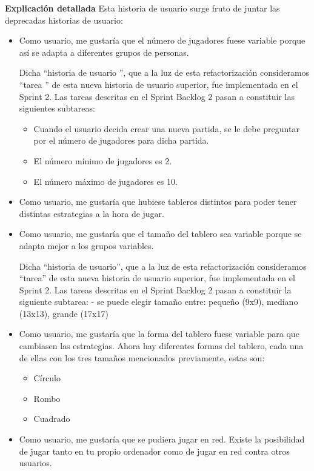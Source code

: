 \documentclass[../../FINAL/Scrum/SCRUM.tex]{subfiles}
\begin{document}
\textbf{Explicación detallada}
Esta historia de usuario surge fruto de juntar las deprecadas historias de usuario:
\begin{itemize}
\item  Como usuario, me gustaría que el número de jugadores fuese variable porque así se adapta a diferentes grupos de personas. 

    Dicha  ``historia de usuario '', que a la luz de esta refactorización consideramos  ``tarea '' de esta nueva historia de usuario superior, fue implementada en el Sprint 2. Las tareas descritas en el Sprint Backlog 2 pasan a constituir las siguientes subtareas:
    \begin{itemize}
  	  \item Cuando el usuario decida crear una nueva partida, se le debe preguntar por el número de jugadores para dicha partida.
      \item El número mínimo de jugadores es 2.
      \item El número máximo de jugadores es 10.
    \end{itemize}

\item  Como usuario, me gustaría que hubiese tableros distintos para poder tener distintas estrategias a la hora de jugar. 

\item  Como usuario, me gustaría que el tamaño del tablero sea variable porque se adapta mejor a los grupos variables. 

    Dicha  ``historia de usuario'', que a la luz de esta refactorización consideramos  ``tarea'' de esta nueva historia de usuario superior, fue implementada en el Sprint 2. Las tareas descritas en el Sprint Backlog 2 pasan a constituir la siguiente subtarea:
     - se puede elegir tamaño entre: pequeño (9x9), mediano (13x13), grande (17x17)

\item  Como usuario, me gustaría que la forma del tablero fuese variable para que cambiasen las estrategias. 
    Ahora hay diferentes formas del tablero, cada una de ellas con los tres tamaños mencionados previamente, estas son:
    \begin{itemize}
    	\item Círculo
    	\item Rombo
    	\item Cuadrado
    \end{itemize}

\item  Como usuario, me gustaría que se pudiera jugar en red. 
    Existe la posibilidad de jugar tanto en tu propio ordenador como de jugar en red contra otros usuarios.


\end{itemize}
\end{document}
